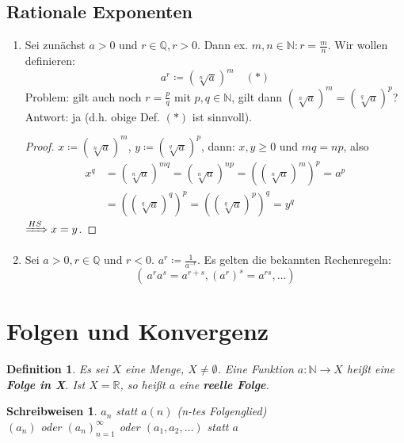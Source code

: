 \documentclass[14pt,titlepage,ngerman,a4paper,headsepline,DIV15,halfparskip*]{scrartcl}
\newcommand{\N}{\mathbb{N}}
\newcommand{\Q}{\mathbb{Q}}
\newcommand{\R}{\mathbb{R}}
\theoremstyle{named}
\theoremstyle{dotless}
\newtheorem*{definition}{Definition}
\newtheorem*{schreibweisen}{Schreibweisen}
\begin{document}
\subsection*{Rationale Exponenten}
\begin{enumerate}
	\item Sei zunächst $a > 0$ und $r \in \Q, r > 0$. Dann ex. $m, n \in \N : r = \frac{m}{n}$. Wir wollen definieren:
		$$
			a^{r} \coloneqq \left( \sqrt[n]{a} \right)^{m} \quad (*)
		$$
		Problem: gilt auch noch $r = \frac{p}{q}$ mit $p, q \in \N$, gilt dann $\left( \sqrt[n]{a} \right)^{m} = \left( \sqrt[q]{a} \right)^{p}$? \\
		Antwort: ja (d.h. obige Def. $(*)$ ist sinnvoll).
		\begin{proof}
			$x \coloneqq \left( \sqrt[n]{a} \right)^{m}$, $y \coloneqq \left( \sqrt[q]{a} \right)^{p}$, dann: $x, y \geq 0$ und $mq = np$, also
			\begin{align*}
				x^{q} & = \left( \sqrt[n]{a} \right)^{mq} = \left( \sqrt[n]{a} \right)^{np} = \left(  \left( \sqrt[n]{a} \right)^{m}\right)^{p} = a^{p} \\
					  & = \left( \left( \sqrt[q]{a} \right)^{q}\right)^{p} = \left( \left( \sqrt[q]{a} \right)^{p}\right)^{q} = y^{q}
			\end{align*}
			$\xRightarrow[]{HS} x = y$.  
		\end{proof}
	\item Sei $a > 0, r \in \Q$ und $r < 0$. $a^{r} \coloneqq \frac{1}{a^{-r}}$. Es gelten die bekannten Rechenregeln:
		$$
			\left( ~ a^{r} a^{s} = a^{r + s}, \left( a^{r} \right)^{s} = a^{rs}, \dotsc \right)
		$$
\end{enumerate}


\newpage


\section{Folgen und Konvergenz}

\begin{definition}
	Es sei $X$ eine Menge, $X \neq \emptyset$. Eine Funktion $a \colon \N \to X$ hei{\ss}t eine \textbf{Folge in X}. Ist $X = \R$, so hei{\ss}t $a$ eine \textbf{reelle Folge}.
\end{definition}


\begin{schreibweisen}
$a_{n}$ statt $a(n)$ (n-tes Folgenglied) \\
$(a_{n})$ oder $(a_{n})_{n = 1}^{\infty}$ oder $(a_{1}, a_{2}, \dotsc)$ statt $a$
\end{schreibweisen}
\end{document}
